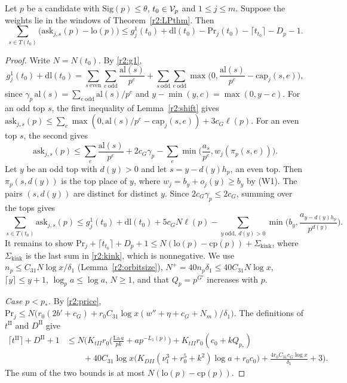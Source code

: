 \begin{proposition}\label{r2:star}
Let $p$ be a candidate with $\mathrm{Sig}(p)\le\theta$, $t_0\in\mathcal V_p$ and $1\le j\le m$. Suppose the weights lie in the windows of Theorem~\ref{r2:LPthm}. Then
\[
\sum_{s\in T(t_0)}\big(\mathrm{ask}_{j,s}(p)-\mathrm{lo}(p)\big)\le g^1_j(t_0)+\mathrm{dl}(t_0)-\mathrm{Pr}_j(t_0)-\lceil t_{t_0}\rceil-D_p-1 .
\]
\end{proposition}

\begin{proof}
Write $N=N(t_0)$. By \eqref{r2:g1},
\[
g^1_j(t_0)+\mathrm{dl}(t_0)=\sum_{s\ \mathrm{even}}\sum_{e\ \mathrm{odd}}\frac{\mathrm{al}(s)}{p^e}+\sum_{s\ \mathrm{odd}}\sum_{e\ \mathrm{odd}}\max\Big(0,\frac{\mathrm{al}(s)}{p^e}-\mathrm{cap}_j(s,e)\Big),
\]
since $\gamma_p\,\mathrm{al}(s)=\sum_{e\ \mathrm{odd}}\mathrm{al}(s)/p^e$ and $y-\min(y,c)=\max(0,y-c)$. For an odd top $s$, the first inequality of Lemma~\ref{r2:shift} gives $\mathrm{ask}_{j,s}(p)\le\sum_e\max(0,\mathrm{al}(s)/p^e-\mathrm{cap}_j(s,e))+3c_G\ell(p)$. For an even top $s$, the second gives
\[
\mathrm{ask}_{j,s}(p)\le\sum_e\frac{\mathrm{al}(s)}{p^e}+2c_G\gamma_p-\sum_e\min\Big(\frac{a_s}{p^e},w_j(\pi_p(s,e))\Big).
\]
Let $y$ be an odd top with $d(y)>0$ and let $s=y-d(y)h_p$, an even top. Then $\pi_p(s,d(y))$ is the top place of $y$, where $w_j=b_y+o_j(y)\ge b_y$ by (W1). The pairs $(s,d(y))$ are distinct for distinct $y$. Since $2c_G\gamma_p\le2c_G$, summing over the tops gives
\begin{equation}\label{r2:kink}
\sum_{s\in T(t_0)}\mathrm{ask}_{j,s}(p)\le g^1_j(t_0)+\mathrm{dl}(t_0)+5c_GN\ell(p)-\sum_{y\ \mathrm{odd},\ d(y)>0}\min\Big(b_y,\frac{a_{y-d(y)h_p}}{p^{d(y)}}\Big).
\end{equation}
It remains to show $\mathrm{Pr}_j+\lceil t_{t_0}\rceil+D_p+1\le N(\mathrm{lo}(p)-\mathrm{cp}(p))+\Sigma_{\mathrm{kink}}$, where $\Sigma_{\mathrm{kink}}$ is the last sum in \eqref{r2:kink}, which is nonnegative. We use $n_p\le C_{31}N\log x/\delta_1$ (Lemma~\ref{r2:orbitsize}), $N^+=40n_p\delta_1\le40C_{31}N\log x$, $\lceil y\rceil\le y+1$, $\log_pa\le\log a$, $N\ge1$, and that $Q_p=p^{G'}$ increases with $p$.

\emph{Case $p<p_*$.} By \eqref{r2:price}, $\mathrm{Pr}_j\le N\big(r_0(2b'+c_G)+r_0C_{31}\log x(w''+\eta+c_G+N_m)/\delta_1\big)$. The definitions of $t^{\mathrm{II}}$ and $D^{\mathrm{II}}$ give
\[
\begin{aligned}
\lceil t^{\mathrm{II}}\rceil+D^{\mathrm{II}}+1&\le N\Big(K_{tII}r_0\Big(\frac{\mathrm{La}\,a}{pk}+ap^{-L_1(p)}\Big)+K_{tII}r_0(c_0+kQ_{p_*})\\ &\qquad {}+40C_{31}\log x\big(K_{DII}(\nu_1^3+r_0^5+k^2)\log a+r_0c_0\big)+\frac{4r_0C_{31}c_G\log x}{\delta_1}+3\Big).
\end{aligned}
\]
The sum of the two bounds is at most $N(\mathrm{lo}(p)-\mathrm{cp}(p))$.


\end{proof}
